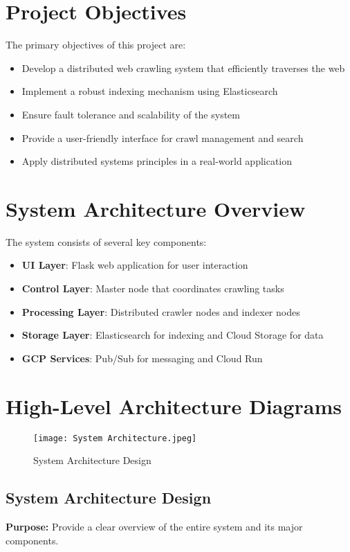 \documentclass[12pt,a4paper]{report}
\begin{document}
\section{Project Objectives}
The primary objectives of this project are:
\begin{itemize}
    \item Develop a distributed web crawling system that efficiently traverses the web
    \item Implement a robust indexing mechanism using Elasticsearch
    \item Ensure fault tolerance and scalability of the system
    \item Provide a user-friendly interface for crawl management and search
    \item Apply distributed systems principles in a real-world application
\end{itemize}

\section{System Architecture Overview}
The system consists of several key components:
\begin{itemize}
    \item \textbf{UI Layer}: Flask web application for user interaction
    \item \textbf{Control Layer}: Master node that coordinates crawling tasks
    \item \textbf{Processing Layer}: Distributed crawler nodes and indexer nodes
    \item \textbf{Storage Layer}: Elasticsearch for indexing and Cloud Storage for data
    \item \textbf{GCP Services}: Pub/Sub for messaging and Cloud Run
\end{itemize}
\newpage
\section{High-Level Architecture Diagrams}
\begin{figure}[htb!]
\centering
\texttt{[image: System Architecture.jpeg]}
\caption{System Architecture Design}
\label{fig:enter-label}
\end{figure}
\subsection{System Architecture Design}
\textbf{Purpose:} Provide a clear overview of the entire system and its major components.
\end{document}
